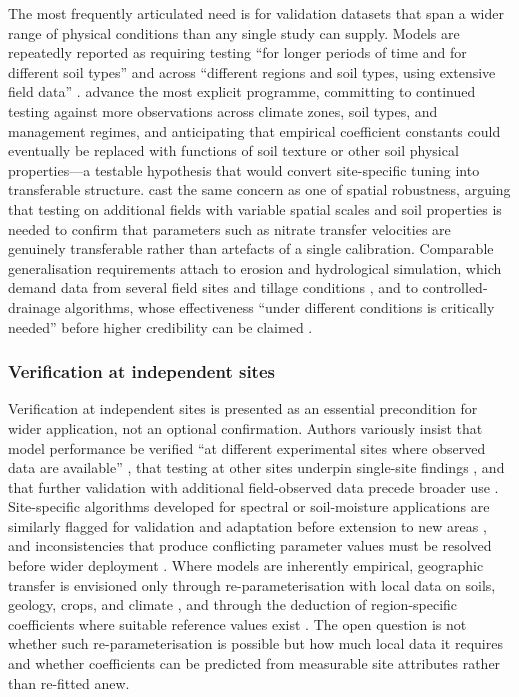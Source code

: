 The most frequently articulated need is for validation datasets that span a wider range of physical conditions than any single study can supply. Models are repeatedly reported as requiring testing ``for longer periods of time and for different soil types'' \parencite{Salazar2009} and across ``different regions and soil types, using extensive field data'' \parencite{Li2026}. \textcite{Li2006} advance the most explicit programme, committing to continued testing against more observations across climate zones, soil types, and management regimes, and anticipating that empirical coefficient constants could eventually be replaced with functions of soil texture or other soil physical properties---a testable hypothesis that would convert site-specific tuning into transferable structure. \textcite{Chelil2022} cast the same concern as one of spatial robustness, arguing that testing on additional fields with variable spatial scales and soil properties is needed to confirm that parameters such as nitrate transfer velocities are genuinely transferable rather than artefacts of a single calibration. Comparable generalisation requirements attach to erosion and hydrological simulation, which demand data from several field sites and tillage conditions \parencite{Turunen2020}, and to controlled-drainage algorithms, whose effectiveness ``under different conditions is critically needed'' before higher credibility can be claimed \parencite{Negm2017}.

\subsubsection{Verification at independent sites}

Verification at independent sites is presented as an essential precondition for wider application, not an optional confirmation. Authors variously insist that model performance be verified ``at different experimental sites where observed data are available'' \parencite{Azevedo1997}, that testing at other sites underpin single-site findings \parencite{Qi2015}, and that further validation with additional field-observed data precede broader use \parencite{Kalita1998,Sadhukhan2019b}. Site-specific algorithms developed for spectral or soil-moisture applications are similarly flagged for validation and adaptation before extension to new areas \parencite{Rijal2013}, and inconsistencies that produce conflicting parameter values must be resolved before wider deployment \parencite{Dar2022}. Where models are inherently empirical, geographic transfer is envisioned only through re-parameterisation with local data on soils, geology, crops, and climate \parencite{Azevedo1997}, and through the deduction of region-specific coefficients where suitable reference values exist \parencite{FathAllah2025}. The open question is not whether such re-parameterisation is possible but how much local data it requires and whether coefficients can be predicted from measurable site attributes rather than re-fitted anew.

